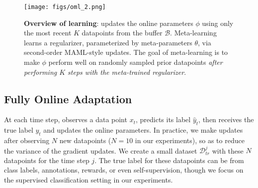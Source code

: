 \begin{figure*}[!h]
    \vspace{-0.1in}
    \centering
    \begin{minipage}[]{0.48\textwidth}
        \texttt{[image: figs/oml\_2.png]}
    \end{minipage}
    \hfill
    \begin{minipage}[]{0.5\textwidth}
        \vspace{0.4cm}
        \caption{\textbf{Overview of \ours learning}: \ours updates the online parameters $\phi$ using only the most recent $K$ datapoints from the buffer $\mathcal{B}$. Meta-learning learns a regularizer, parameterized by meta-parameters $\theta$, via second-order MAML-style updates. The goal of meta-learning is to make $\phi$ perform well on randomly sampled prior datapoints \emph{after performing $K$ steps with the meta-trained regularizer}.
        }
        \label{fig:overview}
    \end{minipage}
    \vspace{-0.2in}
\end{figure*}


\subsection{Fully Online Adaptation}


At each time step, \ours observes a data point $x_t$, predicts its label $\hat{y}_t$, then receives the true label $y_t$ and updates the online parameters. In practice, we make updates after observing $N$ new datapoints ($N = 10$ in our experiments), so as to reduce the variance of the gradient updates. We create a small dataset $\mathcal{D}^j_{tr}$ with these $N$ datapoints for the time step $j$. The true label for these datapoints can be from class labels, annotations, rewards, or even self-supervision, though we focus on the supervised classification setting in our experiments. 

